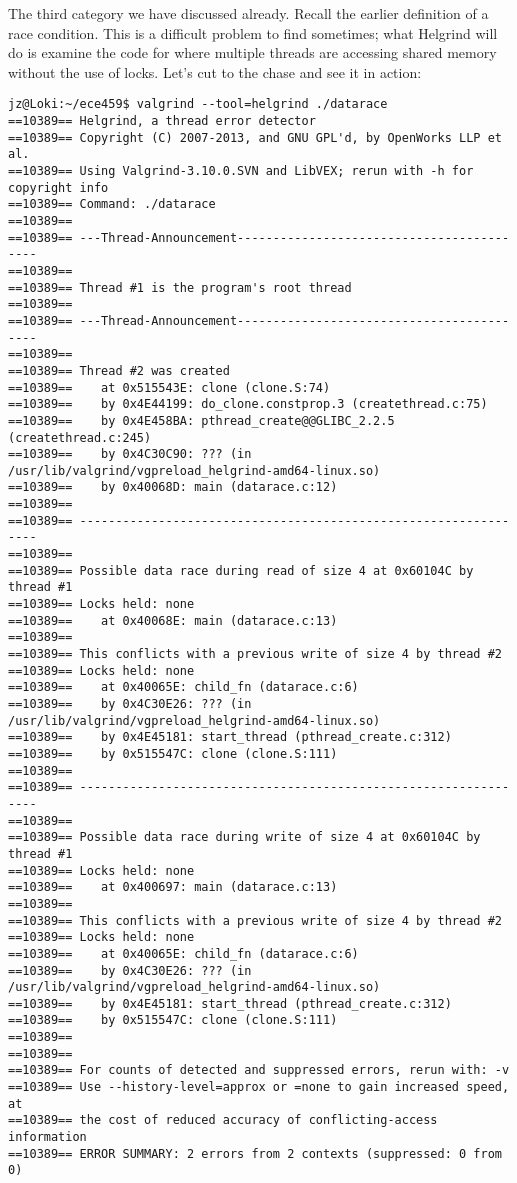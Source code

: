 The third category we have discussed already. Recall the earlier definition of a race condition. This is a difficult problem to find sometimes; what Helgrind will do is examine the code for where multiple threads are accessing shared memory without the use of locks. Let's cut to the chase and see it in action:


\begin{verbatim}
jz@Loki:~/ece459$ valgrind --tool=helgrind ./datarace
==10389== Helgrind, a thread error detector
==10389== Copyright (C) 2007-2013, and GNU GPL'd, by OpenWorks LLP et al.
==10389== Using Valgrind-3.10.0.SVN and LibVEX; rerun with -h for copyright info
==10389== Command: ./datarace
==10389== 
==10389== ---Thread-Announcement------------------------------------------
==10389== 
==10389== Thread #1 is the program's root thread
==10389== 
==10389== ---Thread-Announcement------------------------------------------
==10389== 
==10389== Thread #2 was created
==10389==    at 0x515543E: clone (clone.S:74)
==10389==    by 0x4E44199: do_clone.constprop.3 (createthread.c:75)
==10389==    by 0x4E458BA: pthread_create@@GLIBC_2.2.5 (createthread.c:245)
==10389==    by 0x4C30C90: ??? (in /usr/lib/valgrind/vgpreload_helgrind-amd64-linux.so)
==10389==    by 0x40068D: main (datarace.c:12)
==10389== 
==10389== ----------------------------------------------------------------
==10389== 
==10389== Possible data race during read of size 4 at 0x60104C by thread #1
==10389== Locks held: none
==10389==    at 0x40068E: main (datarace.c:13)
==10389== 
==10389== This conflicts with a previous write of size 4 by thread #2
==10389== Locks held: none
==10389==    at 0x40065E: child_fn (datarace.c:6)
==10389==    by 0x4C30E26: ??? (in /usr/lib/valgrind/vgpreload_helgrind-amd64-linux.so)
==10389==    by 0x4E45181: start_thread (pthread_create.c:312)
==10389==    by 0x515547C: clone (clone.S:111)
==10389== 
==10389== ----------------------------------------------------------------
==10389== 
==10389== Possible data race during write of size 4 at 0x60104C by thread #1
==10389== Locks held: none
==10389==    at 0x400697: main (datarace.c:13)
==10389== 
==10389== This conflicts with a previous write of size 4 by thread #2
==10389== Locks held: none
==10389==    at 0x40065E: child_fn (datarace.c:6)
==10389==    by 0x4C30E26: ??? (in /usr/lib/valgrind/vgpreload_helgrind-amd64-linux.so)
==10389==    by 0x4E45181: start_thread (pthread_create.c:312)
==10389==    by 0x515547C: clone (clone.S:111)
==10389== 
==10389== 
==10389== For counts of detected and suppressed errors, rerun with: -v
==10389== Use --history-level=approx or =none to gain increased speed, at
==10389== the cost of reduced accuracy of conflicting-access information
==10389== ERROR SUMMARY: 2 errors from 2 contexts (suppressed: 0 from 0)
\end{verbatim}

